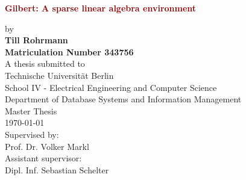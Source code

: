 \begin{titlepage}
	\strut
	\hfill
	\begin{center}
	\vspace{1cm}
	\Huge
	\begin{spacing}{.9}
		\textcolor{DarkRed}{\textbf{Gilbert: A sparse linear algebra environment}}\\
	\end{spacing}
	\vspace{0.8cm}
	\large
	by\\
	\vspace{0.8cm} 
	\textbf{Till Rohrmann}\\
	\vspace{0.8cm} 
	\textbf{Matriculation Number 343756}\\
	\vspace{2cm} 
 	A thesis submitted to\\
	\vspace{0.5cm}
	Technische Universität Berlin\\
	School IV - Electrical Engineering and Computer Science\\
	Department of Database Systems and Information Management\\
	\vspace{0.5cm}
	Master Thesis\\
	\vspace{2.2cm}
	\today\\
	\vspace{2.0cm}
	\large
	Supervised by:\\
	Prof. Dr. Volker Markl\\
	\vspace{1cm}
	Assistant supervisor:\\
	Dipl. Inf. Sebastian Schelter
	\end{center}
\end{titlepage}